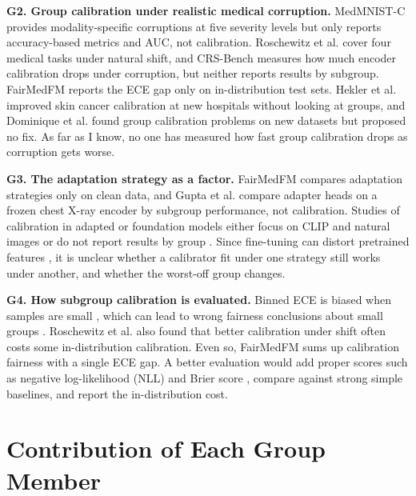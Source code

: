 \documentclass[sigconf,nonacm]{acmart}
\begin{document}
\textbf{G2. Group calibration under realistic medical corruption.} MedMNIST-C \cite{disalvo2024medmnistc} provides modality-specific corruptions at five severity levels but only reports accuracy-based metrics and AUC, not calibration. Roschewitz et al. \cite{roschewitz2025where} cover four medical tasks under natural shift, and CRS-Bench \cite{lin2026crsbench} measures how much encoder calibration drops under corruption, but neither reports results by subgroup. FairMedFM reports the ECE gap only on in-distribution test sets. Hekler et al. \cite{hekler2023tta} improved skin cancer calibration at new hospitals without looking at groups, and Dominique et al. \cite{dominique2025calibration} found group calibration problems on new datasets but proposed no fix. As far as I know, no one has measured how fast group calibration drops as corruption gets worse.

\textbf{G3. The adaptation strategy as a factor.} FairMedFM compares adaptation strategies only on clean data, and Gupta et al. \cite{gupta2026subgroup} compare adapter heads on a frozen chest X-ray encoder by subgroup performance, not calibration. Studies of calibration in adapted or foundation models either focus on CLIP and natural images \cite{tu2024empirical,oh2024calibrated,murugesan2024robust} or do not report results by group \cite{roschewitz2025where,hekler2025beyond,huang2026uncertainty,lin2026crsbench}. Since fine-tuning can distort pretrained features \cite{kumar2022finetuning}, it is unclear whether a calibrator fit under one strategy still works under another, and whether the worst-off group changes.

\textbf{G4. How subgroup calibration is evaluated.} Binned ECE is biased when samples are small \cite{kumar2019verified,roelofs2022mitigating}, which can lead to wrong fairness conclusions about small groups \cite{riccilara2023calibration}. Roschewitz et al. also found that better calibration under shift often costs some in-distribution calibration. Even so, FairMedFM sums up calibration fairness with a single ECE gap. A better evaluation would add proper scores such as negative log-likelihood (NLL) and Brier score \cite{brier1950verification,gruber2022proper}, compare against strong simple baselines, and report the in-distribution cost.

\section{Contribution of Each Group Member}
\end{document}
